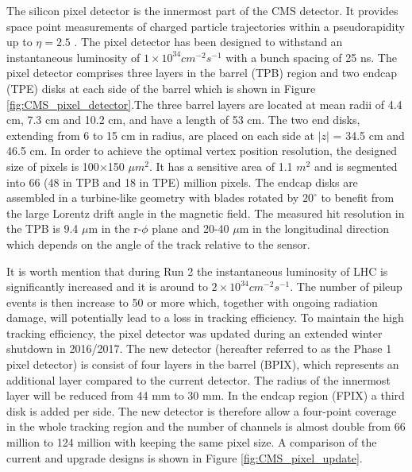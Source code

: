 The silicon pixel detector is the innermost part of the CMS detector. It provides space point measurements of charged particle trajectories within a pseudorapidity up to $\eta=2.5$ . The pixel detector has been designed to withstand an instantaneous luminosity of $1\times10^{34}cm^{-2}s^{-1}$ with a bunch spacing of 25 ns. The pixel detector comprises three layers in the barrel (TPB) region and two endcap (TPE) disks at each side of the barrel which is shown in Figure \ref{fig:CMS_pixel_detector}.The three barrel layers are located at mean radii of 4.4 cm, 7.3 cm and 10.2 cm, and have a length of 53 cm. The two end disks, extending from 6 to 15 cm in radius, are placed on each side at $|z|$ = 34.5 cm and 46.5 cm. In order to achieve the optimal vertex position resolution, the designed size of pixels is 100$\times$150 $\mu m^{2}$. It has a sensitive area of 1.1 $m^{2}$ and is segmented into 66 (48 in TPB and 18 in TPE) million pixels. The endcap disks are assembled in a turbine-like geometry with blades rotated by $20^{\circ}$ to
 benefit from the large Lorentz drift angle in the magnetic field. The measured hit resolution in the TPB is 9.4 $\mu$m in the r-$\phi$ plane and 20-40 $\mu$m in the longitudinal direction which depends on the angle of the track relative to the sensor.

It is worth mention that during Run 2 the instantaneous luminosity of LHC is significantly increased and it is around to $2\times10^{34}cm^{-2}s^{-1}$. The number of pileup events is then increase to 50 or more which, together with ongoing radiation damage, will potentially lead to a loss in tracking efficiency. To maintain the high tracking efficiency, the pixel detector was updated during an extended winter shutdown in 2016/2017.  The new detector (hereafter referred to as the Phase 1 pixel detector) is consist of four layers in the barrel (BPIX), which represents an additional layer compared to the current detector. The radius of the innermost layer will be reduced from 44 mm to 30 mm. In the endcap region (FPIX) a third disk is added per side. The new detector is therefore allow a four-point coverage in the whole tracking region and the number of channels is almost double from 66 million to 124 million with keeping the same pixel size. A comparison of the current and upgrade designs is shown in Figure \ref{fig:CMS_pixel_update}.

